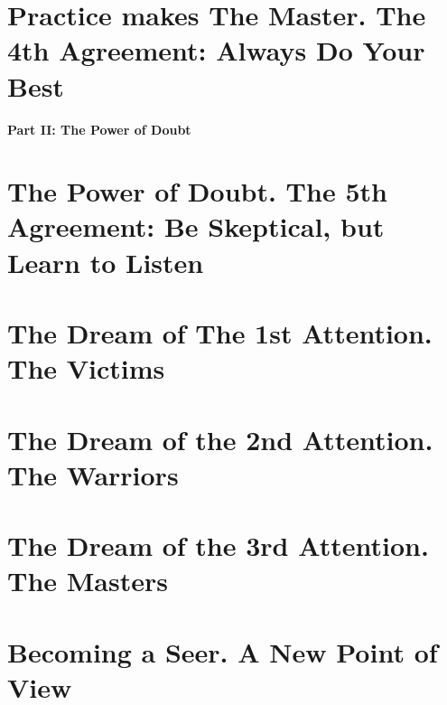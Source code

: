 \documentclass{article}
\numberwithin{equation}{section}
\begin{document}

\section{Practice makes The Master. The 4th Agreement: Always Do Your Best}


\begin{center}\Large\bf
	Part II: The Power of Doubt
\end{center}

\section{The Power of Doubt. The 5th Agreement: Be Skeptical, but Learn to Listen}


\section{The Dream of The 1st Attention. The Victims}


\section{The Dream of the 2nd Attention. The Warriors}


\section{The Dream of the 3rd Attention. The Masters}


\section{Becoming a Seer. A New Point of View}

\end{document}

